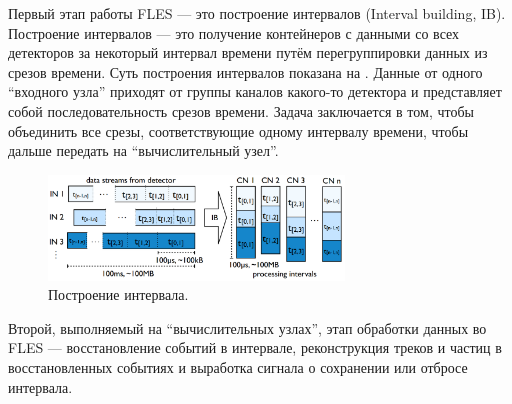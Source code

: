 Первый этап работы FLES --- это построение интервалов (Interval building, IB). Построение интервалов --- это получение контейнеров с данными со всех детекторов за некоторый интервал времени путём перегруппировки данных из срезов времени. Суть построения интервалов показана на . Данные от одного ``входного узла'' приходят от группы каналов какого-то детектора и представляет собой последовательность срезов времени. Задача заключается в том, чтобы объединить все срезы, соответствующие одному интервалу времени, чтобы дальше передать на ``вычислительный узел''.


\begin{figure}[H]
\centering
\includegraphics[width=0.7\textwidth]{pictures/Interval_building.png}
\caption{Построение интервала.}
\label{fig:IntervalBuilding}
\end{figure}

Второй, выполняемый на ``вычислительных узлах'', этап обработки данных во FLES --- восстановление событий в интервале, реконструкция треков и частиц в восстановленных событиях и выработка сигнала о сохранении или отбросе интервала.

